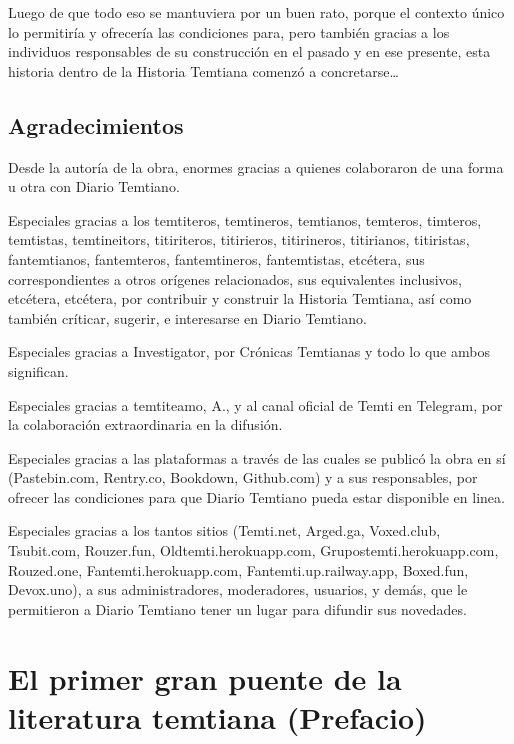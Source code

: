 \documentclass[
]{book}
\begin{document}
Luego de que todo eso se mantuviera por un buen rato, porque el contexto único lo permitiría y ofrecería las condiciones para, pero también gracias a los individuos responsables de su construcción en el pasado y en ese presente, esta historia dentro de la Historia Temtiana comenzó a concretarse\ldots{}

\hypertarget{agradecimientos}{%
\section*{Agradecimientos}\label{agradecimientos}}

Desde la autoría de la obra, enormes gracias a quienes colaboraron de una forma u otra con Diario Temtiano.

Especiales gracias a los temtiteros, temtineros, temtianos, temteros, timteros, temtistas, temtineitors, titiriteros, titirieros, titirineros, titirianos, titiristas, fantemtianos, fantemteros, fantemtineros, fantemtistas, etcétera, sus correspondientes a otros orígenes relacionados, sus equivalentes inclusivos, etcétera, etcétera, por contribuir y construir la Historia Temtiana, así como también críticar, sugerir, e interesarse en Diario Temtiano.

Especiales gracias a Investigator, por Crónicas Temtianas y todo lo que ambos significan.

Especiales gracias a temtiteamo, A., y al canal oficial de Temti en Telegram, por la colaboración extraordinaria en la difusión.

Especiales gracias a las plataformas a través de las cuales se publicó la obra en sí (Pastebin.com, Rentry.co, Bookdown, Github.com) y a sus responsables, por ofrecer las condiciones para que Diario Temtiano pueda estar disponible en linea.

Especiales gracias a los tantos sitios (Temti.net, Arged.ga, Voxed.club, Tsubit.com, Rouzer.fun, Oldtemti.herokuapp.com, Grupostemti.herokuapp.com, Rouzed.one, Fantemti.herokuapp.com, Fantemti.up.railway.app, Boxed.fun, Devox.uno), a sus administradores, moderadores, usuarios, y demás, que le permitieron a Diario Temtiano tener un lugar para difundir sus novedades.

\hypertarget{el-primer-gran-puente-de-la-literatura-temtiana-prefacio}{%
\chapter{El primer gran puente de la literatura temtiana (Prefacio)}\label{el-primer-gran-puente-de-la-literatura-temtiana-prefacio}}
\end{document}
